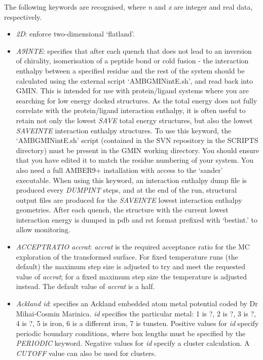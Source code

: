 \documentclass[12pt,a4paper,dvips]{article}
\begin{document}
The following keywords are recognised, where {\it n\/} and {\it x\/} are integer and
real data, respectively.
\smallskip
\begin{itemize}
\item {\it 2D\/}: enforce two-dimensional `flatland'.

\item {\it A9INTE\/}: specifies that after each quench that does not lead to an inversion of chirality, 
isomerisation of a peptide bond or cold fusion - the interaction enthalpy between a specified residue and the rest of the system
should be calculated using the external script `AMBGMINintE.sh', and read back into GMIN. This is intended for
use with protein/ligand systems where you are searching for low energy docked structures. As the total energy
does not fully correlate with the protein/ligand interaction enthalpy, it is often useful to retain not only the
lowest {\it SAVE\/} total energy structures, but also the lowest {\it SAVEINTE\/} interaction enthalpy structures.
To use this keyword, the `AMBGMINintE.sh' script (contained in the SVN repository in the SCRIPTS directory) must
be present in the GMIN working directory. You should ensure that you have edited it to match the residue numbering
of your system. You also need a full AMBER9+ installation with access to the `sander' executable. When using this
keyword, an interaction enthalpy dump file is produced every {\it DUMPINT\/} steps, and at the end of the run, 
structural output files are produced for the {\it SAVEINTE\/} lowest interaction enthalpy geometries. After each quench, 
the structure with the current lowest interaction energy is dumped in pdb and rst format prefixed with `bestint.' to allow
monitoring.

\item {\it ACCEPTRATIO accrat\/}: {\it accrat\/} is the required acceptance ratio for the MC
exploration of the transformed surface. For fixed temperature runs (the default) the maximum step size
is adjusted to try and meet the requested value of {\it accrat\/}; for a fixed maximum
step size the temperature is adjusted instead. The default value of {\it accrat\/} is a half.

\item {\it Ackland id\/}: specifies an Ackland embedded atom metal potential%
coded by Dr Mihai-Cosmin Marinica.
{\it id} specifies the particular metal: 1 is ?, 2 is ?, 3 is ?, 4 is ?, 5 is iron, 6 is a different iron,
7 is tunsten.
Positive values for {\it id} specify periodic boundary conditions, where box lengths must be
specified by the {\it PERIODIC\/} keyword. 
Negative values for {\it id\/} specify a cluster calculation. A {\it CUTOFF\/} value can also
be used for clusters.


\end{itemize}
\end{document}
